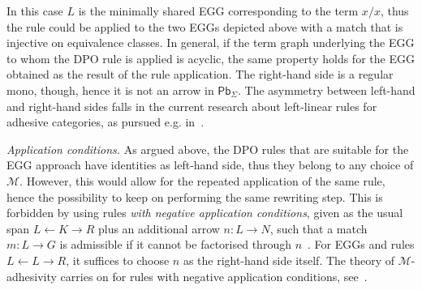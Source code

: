 \documentclass[a4paper,UKenglish,cleveref,pdftex,amsthm,thm-restate,numberwithinsect]{cas-sc}
\newcommand{\pbc}{\mathsf{Pb}}
\theoremstyle{plain}
\theoremstyle{definition}
\begin{document}
\begin{center}
{
}
\end{center}

\noindent
In this case $L$ is the minimally shared EGG corresponding to the term $x / x$,
thus the rule could be applied to the two EGGs
depicted above with a match that is injective on equivalence classes.
%
In general, if the term graph underlying the EGG to whom the DPO rule is applied is acyclic,
the same property holds for the EGG obtained as the result of the rule application.
%
The right-hand side is a regular mono, though, hence it is not an arrow in $\pbc_\Sigma$.
The asymmetry between left-hand and right-hand sides falls in the current research about left-linear rules for 
adhesive categories, as pursued e.g. in~\cite{BaldanC0G24}.

\emph{Application conditions.} 
As argued above, the DPO rules that are suitable for the EGG approach have identities as left-hand side,
thus they belong to any choice of $\mathcal{M}$.
%
However, this would allow for the repeated application of the same rule, hence the 
possibility to keep on performing the same rewriting step.
This is forbidden by using rules \emph{with negative application conditions}, given as the usual span 
$L \leftarrow K \rightarrow R$ plus an additional arrow $n: L\rightarrow N$, such that a match $m: L \to G$ is admissible if it cannot
be factorised through $n$~\cite{HabelHT96}. For EGGs and rules $L \leftarrow L \rightarrow R$, it suffices to choose $n$ as the right-hand side itself.
%
The theory of $\mathcal{M}$-adhesivity carries on for rules with negative application conditions, see~\cite{ehrig2012,ehrig2014adhesive}.
\end{document}
